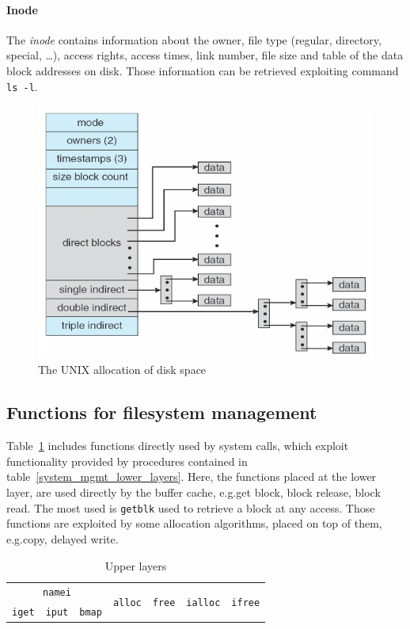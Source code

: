 \paragraph{Inode} The \emph{inode} contains information about the owner, file type (regular, directory, special, \dots), access rights, access times, link number, file size and table of the data block addresses on disk. Those information can be retrieved exploiting command \texttt{ls -l}.

\begin{figure}[hbtp]
\centering
\includegraphics[scale=0.35]{images/file_system/unix_combined_scheme.png}
\caption{The UNIX allocation of disk space}
\end{figure}

\subsection{Functions for filesystem management}
Table~\ref{system_mgmt_upper_layers} includes functions directly used by system calls, which exploit functionality provided by procedures contained in table~\ref{system_mgmt_lower_layers}. Here, the functions placed at the lower layer, are used directly by the buffer cache, e.g.\@ get block, block release, block read. The most used is \texttt{getblk} used to retrieve a block at any access. Those functions are exploited by some allocation algorithms, placed on top of them, e.g.\@ copy, delayed write.

\begin{table}
\centering
\begin{tabular}{|c|c|c|cc|cc|}
\hline 
\multicolumn{3}{|c|}{\texttt{namei}} & \multirow{2}{*}{\texttt{alloc}} & \multirow{2}{*}{\texttt{free}} & \multirow{2}{*}{\texttt{ialloc}} & \multirow{2}{*}{\texttt{ifree}} \\\cline{1-3} 
\texttt{iget} & \texttt{iput} & \texttt{bmap} & & & & \\ 
\hline 
\end{tabular}
\caption{Upper layers}
\label{system_mgmt_upper_layers}
\end{table} 

